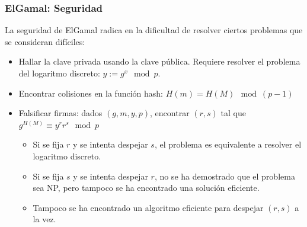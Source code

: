 \documentclass{beamer}
\begin{document}
\begin{frame}
    \frametitle{ElGamal: Seguridad}

    La seguridad de ElGamal radica en la dificultad de resolver ciertos problemas que se consideran difíciles:
    \begin{itemize}
        \item Hallar la clave privada usando la clave pública. Requiere resolver el problema del logaritmo discreto: $y := g^x \mod p$.
        \item Encontrar colisiones en la función hash: $H(m) = H(M) \mod \left(p-1\right) $
        \item Falsificar firmas: dados $(g, m, y, p)$, encontrar $(r, s)$ tal que $g^{H(M)} \equiv y^r r^s \mod p$
        \begin{itemize}
            \item Si se fija $r$ y se intenta despejar $s$, el problema es equivalente a resolver el logaritmo discreto.
            \item Si se fija $s$ y se intenta despejar $r$, no se ha demostrado que el problema sea NP, pero tampoco se ha encontrado una solución eficiente.
            \item Tampoco se ha encontrado un algoritmo eficiente para despejar $(r, s)$ a la vez.
        \end{itemize}
    \end{itemize}
\end{frame}
\end{document}
